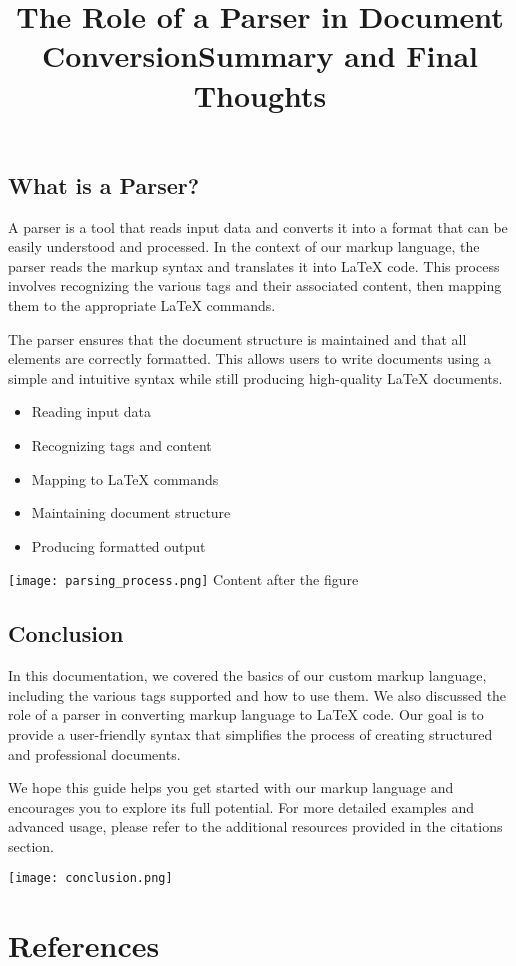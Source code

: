 \documentclass[oneside]{memoir}
\begin{document}
\section{What is a Parser?}
\title{The Role of a Parser in Document Conversion}
A parser is a tool that reads input data and converts it into a format that can be easily understood and processed. In the context of our markup language, the parser reads the markup syntax and translates it into LaTeX code. This process involves recognizing the various tags and their associated content, then mapping them to the appropriate LaTeX commands.\par
The parser ensures that the document structure is maintained and that all elements are correctly formatted. This allows users to write documents using a simple and intuitive syntax while still producing high-quality LaTeX documents.\par
\begin{itemize}
\item Reading input data
\item Recognizing tags and content
\item Mapping to LaTeX commands
\item Maintaining document structure
\item Producing formatted output
\end{itemize}
\texttt{[image: parsing\_process.png]}
Content after the figure\par

\newpage
\section{Conclusion}
\title{Summary and Final Thoughts}
In this documentation, we covered the basics of our custom markup language, including the various tags supported and how to use them. We also discussed the role of a parser in converting markup language to LaTeX code. Our goal is to provide a user-friendly syntax that simplifies the process of creating structured and professional documents.\par
We hope this guide helps you get started with our markup language and encourages you to explore its full potential. For more detailed examples and advanced usage, please refer to the additional resources provided in the citations section.\par
\texttt{[image: conclusion.png]}

\newpage
\chapter{References}
\end{document}

